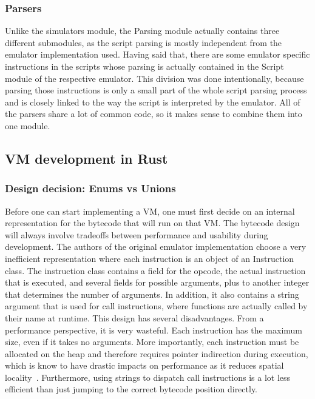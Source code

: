\subsubsection{Parsers}
Unlike the simulators module, the Parsing module actually contains three different submodules, as the script parsing is mostly independent from the emulator implementation used.
Having said that, there are some emulator specific instructions in the scripts whose parsing is actually contained in the Script module of the respective emulator. This division was done intentionally, because parsing those instructions is only a small part of the whole script parsing process and is closely linked to the way the script is interpreted by the emulator.
All of the parsers share a lot of common code, so it makes sense to combine them into one module.

\subsection{VM development in Rust} \label{rust-vm-dev}
\subsubsection{Design decision: Enums vs Unions}
Before one can start implementing a VM, one must first decide on an internal representation for the bytecode that will run on that VM.
The bytecode design will always involve tradeoffs between performance and usability during development.
The authors of the original emulator implementation choose a very inefficient representation where each instruction is an object of an Instruction class. The instruction class contains a field for the opcode, the actual instruction that is executed, and several fields for possible arguments, plus to another integer that determines the number of arguments.
In addition, it also contains a string argument that is used for call instructions, where functions are actually called by their name at runtime.
This design has several disadvantages. From a performance perspective, it is very wasteful. Each instruction has the maximum size, even if it takes no arguments. More importantly, each instruction must be allocated on the heap and therefore requires pointer indirection during execution, which is know to have drastic impacts on performance as it reduces spatial locality~\cite{6498541}.
Furthermore, using strings to dispatch call instructions is a lot less efficient than just jumping to the correct bytecode position directly.

